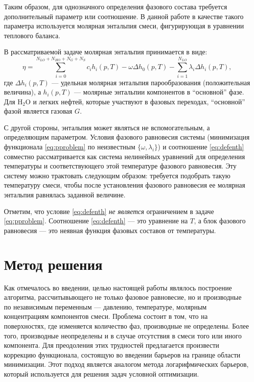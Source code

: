 \documentclass[12pt]{article}
\begin{document}
Таким образом, для однозначного определения фазового состава требуется дополнительный параметр или соотношение. В данной работе в качестве такого параметра используется молярная энтальпия смеси, фигурирующая в уравнении теплового баланса.

В рассматриваемой задаче молярная энтальпия принимается в виде:
\begin{equation}
\eta = \sum_{i=0}^{N_{LO}+N_{HO}+N_{G}+N_{S}} c_i h_i(p,T) -\omega \Delta h_0(p,T) - \sum_{i=1}^{N_{LO}} \lambda_i
\Delta h_i(p,T) , \label{eq:defenth}
\end{equation}
где $\Delta h_i(p,T)$ --- удельная молярная энтальпия парообразования (положительная величина), а $h_i(p,T)$ --- молярные энтальпии компонентов в ``основной'' фазе. Для $\mathrm{H_2O}$ и легких нефтей, которые участвуют в фазовых переходах, ``основной'' фазой является газовая $G$.

С другой стороны, энтальпия может являться не вспомогательным, а определяющим параметром. Условия фазового равновесия системы (минимизация функционала \eqref{eq:pproblem} по неизвестным $\{\omega, \lambda_i\}$) и соотношение \eqref{eq:defenth} совместно рассматривается как система нелинейных уравнений для определения температуры и соответствующего этой температуре фазового равновесия. Эту систему можно трактовать следующим образом: требуется подобрать такую температуру смеси, чтобы после установления фазового равновесия ее молярная энтальпия равнялась заданной величине.

Отметим, что условие \eqref{eq:defenth} \emph{не является} ограничением в задаче \eqref{eq:pproblem}. Соотношение \eqref{eq:defenth} --- это уравнение на $T$, а блок фазового равновесия --- это неявная функция фазовых составов от температуры.


\section{Метод решения}

Как отмечалось во введении, целью настоящей работы являлось построение алгоритма, рассчитывыющего не только фазовое равновесие, но и производные по независимым переменным --- давлению, температуре, молярным концентрациям компонентов смеси. Проблема состоит в том, что на поверхностях, где изменяется количество фаз, производные не определены. Более того, производные неопределены и в случае отсутствия в смеси того или иного компонента. Для преодоления этих трудностей предлагается произвести коррекцию функционала, состоящую во введении барьеров на границе области минимизации. Этот подход является аналогом метода логарифмических барьеров, который используется для решения задач условной оптимизации.
\end{document}
